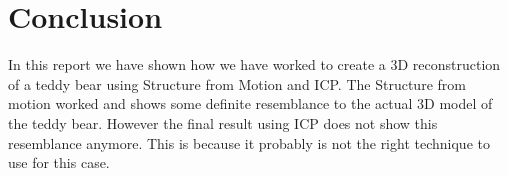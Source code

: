 \section{Conclusion}
\label{conclusion}

In this report we have shown how we have worked to create a 3D reconstruction of a teddy bear using Structure from Motion and ICP. 
The Structure from motion worked and shows some definite resemblance to the actual 3D model of the teddy bear.
However the final result using ICP does not show this resemblance anymore.
This is because it probably is not the right technique to use for this case.
